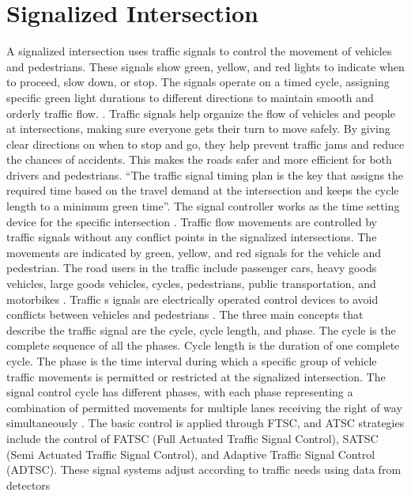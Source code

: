 \section{Signalized Intersection}
A signalized intersection uses traffic signals to control the 
movement of vehicles and pedestrians. These signals show green, 
yellow, and red lights to indicate when to proceed, slow down, or 
stop. The signals operate on a timed cycle, assigning specific 
green light durations to different directions to maintain smooth 
and orderly traffic flow. \cite{duraku2024}. Traffic 
signals help organize the flow of vehicles and people at intersections, 
making sure everyone gets their turn to move safely. By giving clear 
directions on when to stop and go, they help prevent traffic jams 
and reduce the chances of accidents. This makes the roads safer 
and more efficient for both drivers and pedestrians. “The traffic 
signal timing plan is the key that assigns the required time based 
on the travel demand at the intersection and keeps the cycle length 
to a minimum green time”. The signal controller works as the time 
setting device for the specific intersection \cite{fhwa2008}. Traffic 
flow movements are controlled by traffic signals without any 
conflict points in the signalized intersections. The movements 
are indicated by green, yellow, and red signals for the vehicle 
and pedestrian. The road users in the traffic include passenger 
cars, heavy goods vehicles, large goods vehicles, cycles, pedestrians, 
public transportation, and motorbikes \cite{eom2020}. Traffic s
ignals are electrically operated control devices to avoid conflicts 
between vehicles and pedestrians \cite{ryder2005}. The 
three main concepts that describe the traffic signal are the cycle, 
cycle length, and phase. The cycle is the complete sequence of all 
the phases. Cycle length is the duration of one complete cycle. 
The phase is the time interval during which a specific group of 
vehicle traffic movements is permitted or restricted at the signalized 
intersection. The signal control cycle has different phases, with 
each phase representing a combination of permitted movements for 
multiple lanes receiving the right of way simultaneously \cite{hcm2000}. 
The basic control is applied through FTSC, and ATSC strategies include 
the control of FATSC (Full Actuated Traffic Signal Control), SATSC 
(Semi Actuated Traffic Signal Control), and Adaptive Traffic Signal 
Control (ADTSC). These signal systems adjust according to traffic needs 
using data from detectors \cite{duraku2024}

